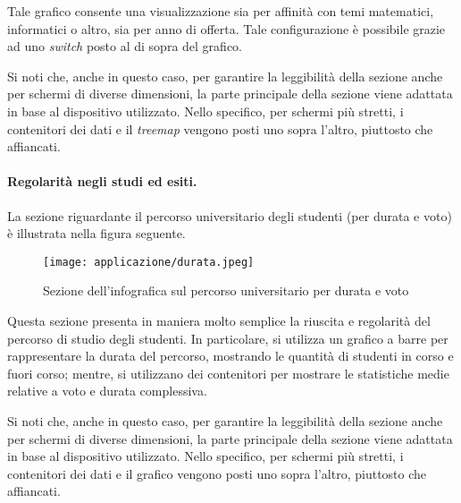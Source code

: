 Tale grafico consente una visualizzazione sia per affinità con temi matematici, informatici o altro, sia per anno di offerta.
Tale configurazione è possibile grazie ad uno \emph{switch} posto al di sopra del grafico.

\bigskip
\noindent Si noti che, anche in questo caso, per garantire la leggibilità della sezione anche per schermi di diverse dimensioni, la parte principale della sezione viene adattata 
in base al dispositivo utilizzato. Nello specifico, per schermi più stretti, i contenitori dei dati e il \emph{treemap} vengono posti uno sopra l'altro, piuttosto che affiancati.

\paragraph{Regolarità negli studi ed esiti.} La sezione riguardante il percorso universitario degli studenti (per durata e voto) è illustrata nella figura seguente. 
\begin{figure}[H] 
    \centering 
    \texttt{[image: applicazione/durata.jpeg]} 
    \caption{Sezione dell'infografica sul percorso universitario per durata e voto}
    \label{fig:app_durata}
\end{figure}
\noindent Questa sezione presenta in maniera molto semplice la riuscita e regolarità del percorso di studio degli studenti. In particolare, si utilizza un grafico a barre 
per rappresentare la durata del percorso, mostrando le quantità di studenti in corso e fuori corso; mentre, si utilizzano dei contenitori per mostrare le statistiche medie relative 
a voto e durata complessiva.

\bigskip
\noindent Si noti che, anche in questo caso, per garantire la leggibilità della sezione anche per schermi di diverse dimensioni, la parte principale della sezione viene adattata 
in base al dispositivo utilizzato. Nello specifico, per schermi più stretti, i contenitori dei dati e il grafico vengono posti uno sopra l'altro, piuttosto che affiancati.

